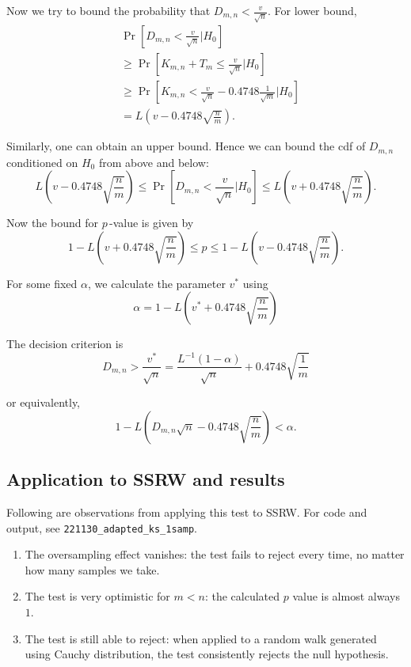 Now we try to bound the probability that $D_{m, n} < \frac{v}{\sqrt{n} }$. For lower bound,
\begin{align*}
	&\operatorname{Pr} \left[ D_{m, n} < \frac{v}{\sqrt{n} }| H_0 \right]\\
	&\ge \operatorname{Pr} \left[ K_{m, n}+ T_m \le  \frac{v}{\sqrt{n} }| H_0 \right]  \\
	&\ge \operatorname{Pr} \left[ K_{m, n}< \frac{v}{\sqrt{n} } - 0.4748 \frac{1}{\sqrt{m} }|H_0 \right]  \\
	&= L\left( v - 0.4748 \sqrt{\frac{n}{m}}  \right)
.\end{align*}

Similarly, one can obtain an upper bound. Hence we can bound the cdf of $D_{m,n}$ conditioned on $H_0$ from above and below:
\[
	L\left( v - 0.4748 \sqrt{\frac{n}{m}}  \right) 
	\le \operatorname{Pr} \left[ D_{m, n} < \frac{v}{\sqrt{n} } | H_0 \right]
	\le L\left( v + 0.4748 \sqrt{\frac{n}{m}}  \right)
.\] 

Now the bound for $p\,$-value is given by
\[
	1 - L\left(v + 0.4748\sqrt{\frac{n}{m}}\right) \le  p \le 
	1 - L\left(v - 0.4748 \sqrt{\frac{n}{m}}\right) 
.\] 

For some fixed $\alpha$, we calculate the parameter  $v^*$ using
\[
	\alpha  = 1 - L\left(v^* + 0.4748\sqrt{\frac{n}{m}}\right)
\] 

The decision criterion is
\[
	D_{m, n} > \frac{v^*}{\sqrt{n} } = \frac{L^{-1} (1 - \alpha)}{\sqrt{n} } + 0.4748 \sqrt{\frac{1}{m}} 
\] 

or equivalently,
\[
	1 - L \left( D_{m, n}\sqrt{n} - 0.4748 \sqrt{\frac{n}{m}} \right)    < \alpha
.\] 

\subsection*{Application to SSRW and results}

Following are observations from applying this test to SSRW. For code and output, see \verb|221130_adapted_ks_1samp|.
\begin{enumerate}
	\item The oversampling effect vanishes: the test fails to reject every time, no matter how many samples we take.
	\item The test is very optimistic for $m < n$: the calculated $p$ value is almost always $1$.
	\item The test is still able to reject: when applied to a random walk generated using Cauchy distribution, the test consistently rejects the null hypothesis.
\end{enumerate}

